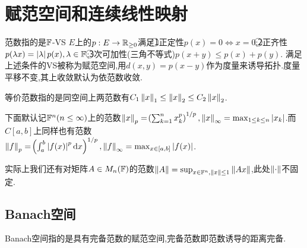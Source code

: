 \documentclass{article}
\begin{document}
\tbc


\section{赋范空间和连续线性映射}
范数指的是$\mathbb{F}$-VS $E$上的$p:E\to \mathbb{R}_{\geq 0}$满足\textcircled{1}正定性$p(x)=0\iff x=0$;\textcircled{2}正齐性$p(\lambda x)=\left|\lambda\right|p(x),\lambda\in \mathbb{F}$;\textcircled{3}次可加性(三角不等式)$p(x+y)\leq p(x)+p(y)$.
满足上述条件的VS被称为赋范空间,用$d(x,y)=p(x-y)$作为度量来诱导拓扑.度量平移不变,其上收敛默认为依范数收敛.

等价范数指的是同空间上两范数有$C_1\left\|x\right\|_1\leq \left\|x\right\|_2\leq C_2\left\|x\right\|_2$.

下面默认记$\mathbb{F}^n (n\leq \infty)$上的范数$\left\|x\right\|_p=\!\left(\sum_{k=1}^n x_k^p\right)^{1/p}, \left\|x\right\|_\infty=\max_{1\leq k\leq n}\left|x_k\right|$.而$C[a,b]$上同样也有范数\\ $\left\|f\right\|_p=\!\left(\int_a^b\left|f(x)\right|^p\mathrm{d} x\right)^{1/p}, \left\|f\right\|_\infty=\max_{x\in [a,b]}\left|f(x)\right|$.

实际上我们还有对矩阵$A\in M_n(\mathbb{F})$的范数$\left\|A\right\|=\sup_{x\in \mathbb{F}^n,\left\|x\right\|\leq 1}\left\|Ax\right\|$,此处$\left\|\cdot\right\|$不固定.

\subsection{Banach空间}
Banach空间指的是具有完备范数的赋范空间,完备范数即范数诱导的距离完备.
\end{document}
